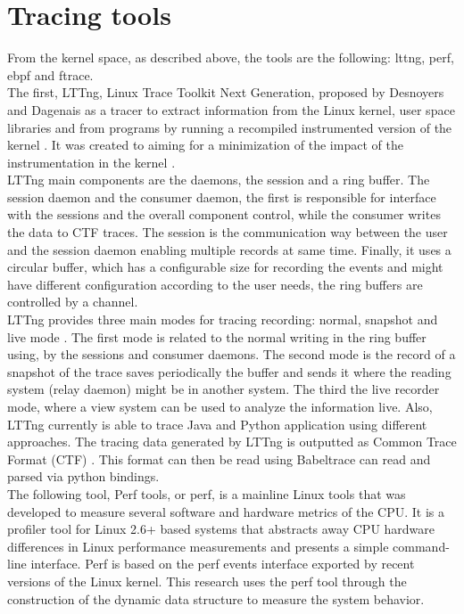 \section{Tracing tools}
From the kernel space, as described above, the tools are the following: lttng, perf, ebpf and ftrace.\\
The first, LTTng, Linux Trace Toolkit Next Generation, proposed by Desnoyers and Dagenais as a tracer to extract information from the Linux kernel, user space libraries and from programs by running a recompiled instrumented version of the kernel \cite{Luk2005PBC10649781065034}. It was created to aiming for a minimization of the impact of the instrumentation in the kernel \cite{Montreal_thelttng}.\\
LTTng main components are the daemons, the session and a ring buffer. The session daemon and the consumer daemon, the first is responsible for interface with the sessions and the overall component control, while the consumer writes the data to CTF traces. The session is the communication way between the user and the session daemon enabling multiple records at same time. Finally, it uses a circular buffer, which has a configurable size for recording the events and might have different configuration according to the user needs, the ring buffers are controlled by a channel.\\
LTTng provides three main modes for tracing recording: normal, snapshot and live mode \cite{lttng}. The first mode is related to the normal writing in the ring buffer using, by  the sessions and consumer daemons. The second mode is the record of a snapshot of the trace saves periodically the buffer and sends it where the reading system (relay daemon) might be in another system.  The third the live recorder mode, where a view system can be used to analyze the information live. Also, LTTng currently is able to trace Java and Python application using different approaches. The tracing data generated by LTTng is outputted as Common Trace Format (CTF) \cite{lttng}. This format can then be read using Babeltrace can read and parsed via python bindings. \\
The following tool, Perf tools, or perf, is a mainline Linux tools that was developed to measure several software and hardware metrics of the CPU. It is a profiler tool for Linux 2.6+ based systems that abstracts away CPU hardware differences in Linux performance measurements and presents a simple command-line interface. Perf is based on the perf events interface exported by recent versions of the Linux kernel. This research uses the perf tool through the construction of the dynamic data structure to measure the system behavior. \\
